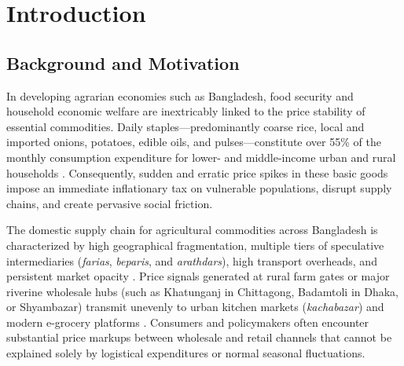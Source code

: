\chapter{Introduction}
\label{ch:introduction}

\section{Background and Motivation}
In developing agrarian economies such as Bangladesh, food security and household economic welfare are inextricably linked to the price stability of essential commodities. Daily staples—predominantly coarse rice, local and imported onions, potatoes, edible oils, and pulses—constitute over 55\% of the monthly consumption expenditure for lower- and middle-income urban and rural households \cite{bbs2023inflation}. Consequently, sudden and erratic price spikes in these basic goods impose an immediate inflationary tax on vulnerable populations, disrupt supply chains, and create pervasive social friction.

The domestic supply chain for agricultural commodities across Bangladesh is characterized by high geographical fragmentation, multiple tiers of speculative intermediaries (\textit{farias}, \textit{beparis}, and \textit{arathdars}), high transport overheads, and persistent market opacity \cite{minten2010food}. Price signals generated at rural farm gates or major riverine wholesale hubs (such as Khatunganj in Chittagong, Badamtoli in Dhaka, or Shyambazar) transmit unevenly to urban kitchen markets (\textit{kachabazar}) and modern e-grocery platforms \cite{worldbank2023bangladesh}. Consumers and policymakers often encounter substantial price markups between wholesale and retail channels that cannot be explained solely by logistical expenditures or normal seasonal fluctuations.

